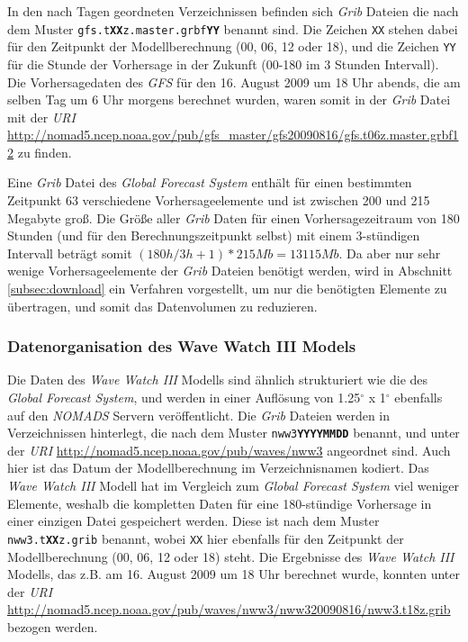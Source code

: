 In den nach Tagen geordneten Verzeichnissen befinden sich
\textit{Grib} Dateien die nach dem Muster
\texttt{gfs.t\textbf{XX}z.master.grbf\textbf{YY}} benannt sind. Die Zeichen
\texttt{XX} stehen dabei für den Zeitpunkt der Modellberechnung (00,
06, 12 oder 18), und die Zeichen \texttt{YY} für die Stunde der
Vorhersage in der Zukunft (00-180 im 3 Stunden Intervall). Die
Vorhersagedaten des \textit{GFS} für den 16. August 2009 um 18 Uhr
abends, die am selben Tag um 6 Uhr morgens berechnet wurden, waren
somit in der \textit{Grib} Datei mit der \textit{URI}
\url{http://nomad5.ncep.noaa.gov/pub/gfs_master/gfs20090816/gfs.t06z.master.grbf12}
zu finden.

Eine \textit{Grib} Datei des \textit{Global Forecast System} enthält
für einen bestimmten Zeitpunkt 63 verschiedene Vorhersageelemente und
ist zwischen 200 und 215 Megabyte groß. Die Größe aller \textit{Grib}
Daten für einen Vorhersagezeitraum von 180 Stunden (und für den
Berechnungszeitpunkt selbst) mit einem 3-stündigen Intervall beträgt
somit $(180h / 3h + 1) * 215 Mb = 13115 Mb$. Da aber nur sehr wenige
Vorhersageelemente der \textit{Grib} Dateien benötigt werden, wird in
Abschnitt \ref{subsec:download} ein Verfahren vorgestellt, um nur die
benötigten Elemente zu übertragen, und somit das Datenvolumen zu
reduzieren.

\subsubsection{Datenorganisation des Wave Watch III Models}

Die Daten des \textit{Wave Watch III} Modells sind ähnlich
strukturiert wie die des \textit{Global Forecast System}, und werden
in einer Auflösung von 1.25$^{\circ}$ x 1$^{\circ}$ ebenfalls auf den
\textit{NOMADS} Servern veröffentlicht. Die \textit{Grib} Dateien
werden in Verzeichnissen hinterlegt, die nach dem Muster
\texttt{nww3\textbf{YYYYMMDD}} benannt, und unter der \textit{URI}
\url{http://nomad5.ncep.noaa.gov/pub/waves/nww3} angeordnet sind. Auch
hier ist das Datum der Modellberechnung im Verzeichnisnamen
kodiert. Das \textit{Wave Watch III} Modell hat im Vergleich zum
\textit{Global Forecast System} viel weniger Elemente, weshalb die
kompletten Daten für eine 180-stündige Vorhersage in einer einzigen
Datei gespeichert werden. Diese ist nach dem Muster
\texttt{nww3.t\textbf{XX}z.grib} benannt, wobei \texttt{XX} hier
ebenfalls für den Zeitpunkt der Modellberechnung (00, 06, 12 oder 18)
steht. Die Ergebnisse des \textit{Wave Watch III} Modells, das z.B. am
16. August 2009 um 18 Uhr berechnet wurde, konnten unter der
\textit{URI}
\url{http://nomad5.ncep.noaa.gov/pub/waves/nww3/nww320090816/nww3.t18z.grib}
bezogen werden.

